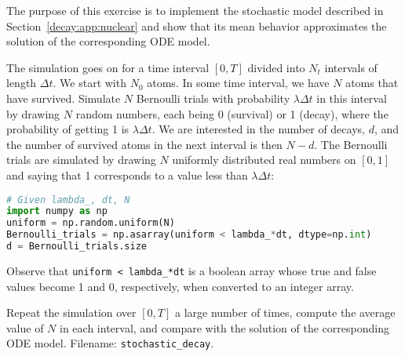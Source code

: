 \documentclass[graybox,sectrefs,envcountresetchap,open=right,final]{svmonodo}
\makeatletter
\newenvironment{doconceexercise}{}{}
\newcounter{doconceexercisecounter}%
\newcommand\listofexercises{
\chapter*{List of Exercises, Problems, and Projects
          \@mkboth{List of Exercises, Problems, and Projects}{List of Exercises, Problems, and Projects}}
\markboth{List of Exercises, Problems, and Projects}{List of Exercises, Problems, and Projects}
\@starttoc{loe}
}
\makeatother
\begin{document}
\begin{doconceexercise}

                
\label{decay:app:exer:stoch:nuclear}

The purpose of this exercise is to implement the stochastic model
described in Section~\ref{decay:app:nuclear} and show that its
mean behavior approximates the solution of the corresponding
ODE model.

The simulation goes on for a time interval $[0,T]$ divided into
$N_t$ intervals of length $\Delta t$. We start with $N_0$
atoms. In some time interval, we have $N$ atoms that have survived.
Simulate $N$ Bernoulli trials with probability $\lambda\Delta t$
in this interval by drawing $N$ random numbers, each being 0 (survival)
or 1 (decay), where the probability of getting 1 is $\lambda\Delta t$.
We are interested in the number of decays, $d$, and the number of
survived atoms in the next interval is then $N-d$.
The Bernoulli trials
are simulated by drawing $N$ uniformly distributed real numbers on
$[0,1]$ and saying that 1 corresponds to a value less than $\lambda\Delta t$:







\begin{lstlisting}[language=python,style=blue1_bluegreen]
# Given lambda_, dt, N
import numpy as np
uniform = np.random.uniform(N)
Bernoulli_trials = np.asarray(uniform < lambda_*dt, dtype=np.int)
d = Bernoulli_trials.size

\end{lstlisting}

Observe that \Verb!uniform < lambda_*dt! is a boolean array whose true
and false values become 1 and 0, respectively, when converted to an
integer array.

Repeat the simulation over $[0,T]$ a large number of times, compute the average
value of $N$ in each interval, and compare with the solution of
the corresponding ODE model.
\noindent Filename: \Verb!stochastic_decay!.

\end{doconceexercise}
\end{document}
